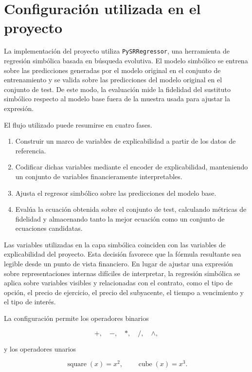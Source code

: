 \section{Configuración utilizada en el proyecto}

La implementación del proyecto utiliza \texttt{PySRRegressor}, una herramienta de regresión simbólica basada en búsqueda evolutiva. El modelo simbólico se entrena sobre las predicciones generadas por el modelo original en el conjunto de entrenamiento y se valida sobre las predicciones del modelo original en el conjunto de test. De este modo, la evaluación mide la fidelidad del sustituto simbólico respecto al modelo base fuera de la muestra usada para ajustar la expresión.

El flujo utilizado puede resumirse en cuatro fases. 
\begin{enumerate}
    \item Construir un marco de variables de explicabilidad a partir de los datos de referencia.
    \item Codificar dichas variables mediante el encoder de explicabilidad, manteniendo un conjunto de variables financieramente interpretables.
    \item Ajusta el regresor simbólico sobre las predicciones del modelo base.
    \item Evalúa la ecuación obtenida sobre el conjunto de test, calculando métricas de fidelidad y almacenando tanto la mejor ecuación como un conjunto de ecuaciones candidatas.
\end{enumerate}

Las variables utilizadas en la capa simbólica coinciden con las variables de explicabilidad del proyecto. Esta decisión favorece que la fórmula resultante sea legible desde un punto de vista financiero. En lugar de ajustar una expresión sobre representaciones internas difíciles de interpretar, la regresión simbólica se aplica sobre variables visibles y relacionadas con el contrato, como el tipo de opción, el precio de ejercicio, el precio del subyacente, el tiempo a vencimiento y el tipo de interés.

La configuración permite los operadores binarios

\begin{equation}
+, \quad -, \quad *, \quad /, \quad \wedge,
\label{eq:symbolic-binary-operators}
\end{equation}

y los operadores unarios

\begin{equation}
\operatorname{square}(x) = x^2,
\qquad
\operatorname{cube}(x) = x^3.
\label{eq:symbolic-unary-operators}
\end{equation}

